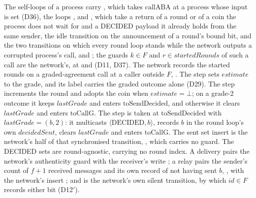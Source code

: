 The self-loops of a process carry , which takes $\mathrm{callABA}$ at a process whose input is set (D36), the loops ,  and , which take a return of a round or of a coin the process does not wait for and a DECIDED payload it already holds from the same sender, the idle transition  on the announcement of a round's bound bit, and the two transitions on which every round loop stands while the network outputs a corrupted process's call,  and ; the guards $k \in F$ and $r \in \mathit{startedRounds}$ of such a call are the network's, at  and  (D11, D37).
The network records the started rounds on a graded-agreement call at a caller outside $F$, .
The step  sets $estimate$ to the grade, and its label carries the graded outcome alone (D29).
The step  increments the round and adopts the coin when $estimate = \bot$; on a grade-2 outcome it keeps $lastGrade$ and enters $\mathrm{toSendDecided}$, and otherwise it clears $lastGrade$ and enters $\mathrm{toCallG}$.
The step  is taken at $\mathrm{toSendDecided}$ with $lastGrade = (b,2)$: it multicasts $\langle\mathrm{DECIDED},b\rangle$, records $b$ in the round loop's own $decidedSent$, clears $lastGrade$ and enters $\mathrm{toCallG}$.
The sent set insert is the network's half of that synchronised transition, , which carries no guard.
The DECIDED sets are round-agnostic, carrying no round index.
A delivery pairs the network's authenticity guard  with the receiver's write ; a relay pairs the sender's count of $f{+}1$ received messages and its own record of not having sent $b$, , with the network's insert ; and  is the network's own silent transition, by which $id \in F$ records either bit (D12$'$).
